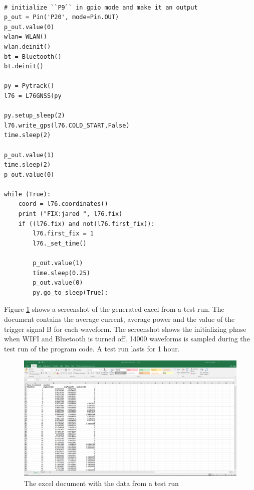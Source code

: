 \lstset{language=Python}          %
\begin{lstlisting}[frame=single, caption= main.py without communication]  % Start your code-block

# initialize ``P9`` in gpio mode and make it an output
p_out = Pin('P20', mode=Pin.OUT)
p_out.value(0)
wlan= WLAN()
wlan.deinit()
bt = Bluetooth()
bt.deinit()

py = Pytrack()
l76 = L76GNSS(py

py.setup_sleep(2)
l76.write_gps(l76.COLD_START,False)
time.sleep(2)

p_out.value(1)
time.sleep(2)
p_out.value(0)

while (True):
    coord = l76.coordinates()
    print ("FIX:jared ", l76.fix)
    if ((l76.fix) and not(l76.first_fix)):
        l76.first_fix = 1
        l76._set_time()

        p_out.value(1)
        time.sleep(0.25)
        p_out.value(0)
        py.go_to_sleep(True):
\end{lstlisting}
\label{code:wifioff}

Figure \ref{fig:WIFI_OFF} shows a screenshot of the generated excel from a test run. The document contains the average current, average power and the value of the trigger signal B for each waveform. The screenshot shows the initializing phase when WIFI and Bluetooth is turned off. 14000 waveforms is sampled during the test run of the program code. A test run lasts for 1 hour.  


\begin{figure}[H]
\centering
\includegraphics[width=16 cm]{Project_Report/Images/wifioff.PNG}
\caption{The excel document with the data from a test run}
\label{fig:WIFI_OFF}
\end{figure}

